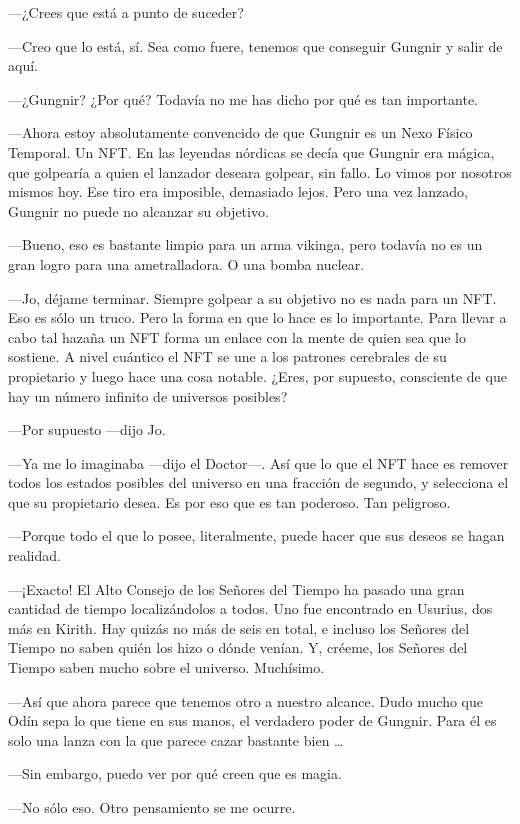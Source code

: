 ---¿Crees que está a punto de suceder?

---Creo que lo está, sí. Sea como fuere, tenemos que conseguir Gungnir y
salir de aquí.

---¿Gungnir? ¿Por qué? Todavía no me has dicho por qué es tan
importante.

---Ahora estoy absolutamente convencido de que Gungnir es un Nexo Físico
Temporal. Un NFT. En las leyendas nórdicas se decía que Gungnir era
mágica, que golpearía a quien el lanzador deseara golpear, sin fallo. Lo
vimos por nosotros mismos hoy. Ese tiro era imposible, demasiado lejos.
Pero una vez lanzado, Gungnir no puede no alcanzar su objetivo.

---Bueno, eso es bastante limpio para un arma vikinga, pero todavía no
es un gran logro para una ametralladora. O una bomba nuclear.

---Jo, déjame terminar. Siempre golpear a su objetivo no es nada para un
NFT. Eso es sólo un truco. Pero la forma en que lo hace es lo
importante. Para llevar a cabo tal hazaña un NFT forma un enlace con la
mente de quien sea que lo sostiene. A nivel cuántico el NFT se une a los
patrones cerebrales de su propietario y luego hace una cosa notable.
¿Eres, por supuesto, consciente de que hay un número infinito de
universos posibles?

---Por supuesto ---dijo Jo.

---Ya me lo imaginaba ---dijo el Doctor---. Así que lo que el NFT hace
es remover todos los estados posibles del universo en una fracción de
segundo, y selecciona el que su propietario desea. Es por eso que es tan
poderoso. Tan peligroso.

---Porque todo el que lo posee, literalmente, puede hacer que sus deseos
se hagan realidad.

---¡Exacto! El Alto Consejo de los Señores del Tiempo ha pasado una gran
cantidad de tiempo localizándolos a todos. Uno fue encontrado en
Usurius, dos más en Kirith. Hay quizás no más de seis en total, e
incluso los Señores del Tiempo no saben quién los hizo o dónde venían.
Y, créeme, los Señores del Tiempo saben mucho sobre el universo.
Muchísimo.

---Así que ahora parece que tenemos otro a nuestro alcance. Dudo mucho
que Odín sepa lo que tiene en sus manos, el verdadero poder de Gungnir.
Para él es solo una lanza con la que parece cazar bastante bien \ldots{}

---Sin embargo, puedo ver por qué creen que es magia.

---No sólo eso. Otro pensamiento se me ocurre.

